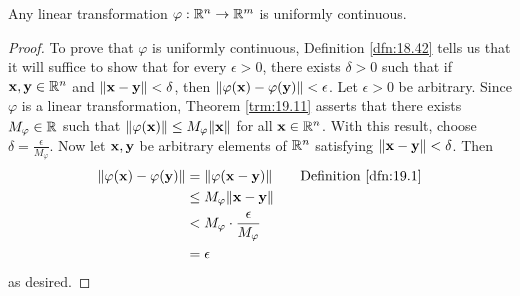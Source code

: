 \documentclass[../main.tex]{subfiles}
\begin{document}
\begin{corollary}\label{cly:19.12}
    Any linear transformation $\varphi:\mathbb{R}^n\to\mathbb{R}^m$ is uniformly continuous.
    \begin{proof}
        To prove that $\varphi$ is uniformly continuous, Definition \ref{dfn:18.42} tells us that it will suffice to show that for every $\epsilon>0$, there exists $\delta>0$ such that if $\mathbf{x},\mathbf{y}\in\mathbb{R}^n$ and $\norm{\mathbf{x}-\mathbf{y}}<\delta$, then $\norm{\varphi(\mathbf{x})-\varphi(\mathbf{y})}<\epsilon$. Let $\epsilon>0$ be arbitrary. Since $\varphi$ is a linear transformation, Theorem \ref{trm:19.11} asserts that there exists $M_\varphi\in\mathbb{R}$ such that $\norm{\varphi(\mathbf{x})}\leq M_\varphi\norm{\mathbf{x}}$ for all $\mathbf{x}\in\mathbb{R}^n$. With this result, choose $\delta=\frac{\epsilon}{M_\varphi}$. Now let $\mathbf{x},\mathbf{y}$ be arbitrary elements of $\mathbb{R}^n$ satisfying $\norm{\mathbf{x}-\mathbf{y}}<\delta$. Then
        \begin{align*}
            \norm{\varphi(\x)-\varphi(\y)} &= \norm{\varphi(\x-\y)}\tag*{Definition \ref{dfn:19.1}}\\
            &\leq M_\varphi\norm{\x-\y}\\
            &< M_\varphi\cdot\frac{\epsilon}{M_\varphi}\\
            &= \epsilon
        \end{align*}
        as desired.
    \end{proof}
\end{corollary}
\end{document}
